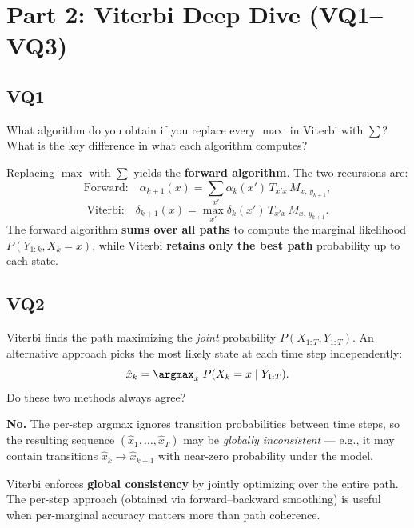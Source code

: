 \documentclass[12pt]{article}
\begin{document}
\newpage
\section*{Part 2: Viterbi Deep Dive (VQ1--VQ3)}

\subsection*{VQ1}
\begin{tcolorbox}[questionbox]
What algorithm do you obtain if you replace every $\max$ in Viterbi with $\sum$?
What is the key difference in what each algorithm computes?
\end{tcolorbox}

\begin{tcolorbox}[answerbox]
Replacing $\max$ with $\sum$ yields the \textbf{forward algorithm}. The two
recursions are:
\[
  \text{Forward:}\quad
  \alpha_{k+1}(x) = \sum_{x'} \alpha_k(x')\, T_{x'x}\, M_{x,\, y_{k+1}},
\]
\[
  \text{Viterbi:}\quad
  \delta_{k+1}(x) = \max_{x'} \delta_k(x')\, T_{x'x}\, M_{x,\, y_{k+1}}.
\]
The forward algorithm \textbf{sums over all paths} to compute the marginal
likelihood $P(Y_{1:k}, X_k = x)$, while Viterbi \textbf{retains only the best
path} probability up to each state.
\end{tcolorbox}

\subsection*{VQ2}
\begin{tcolorbox}[questionbox]
Viterbi finds the path maximizing the \emph{joint} probability
$P(X_{1:T}, Y_{1:T})$. An alternative approach picks the most likely state
at each time step independently:
\[
  \hat{x}_k = \argmax_{x}\; P(X_k = x \mid Y_{1:T}).
\]
Do these two methods always agree?
\end{tcolorbox}

\begin{tcolorbox}[answerbox]
\textbf{No.} The per-step argmax ignores transition probabilities between time
steps, so the resulting sequence $(\hat{x}_1, \ldots, \hat{x}_T)$ may be
\emph{globally inconsistent} --- e.g., it may contain transitions
$\hat{x}_k \to \hat{x}_{k+1}$ with near-zero probability under the model.

Viterbi enforces \textbf{global consistency} by jointly optimizing over the
entire path. The per-step approach (obtained via forward--backward smoothing)
is useful when per-marginal accuracy matters more than path coherence.
\end{tcolorbox}
\end{document}
